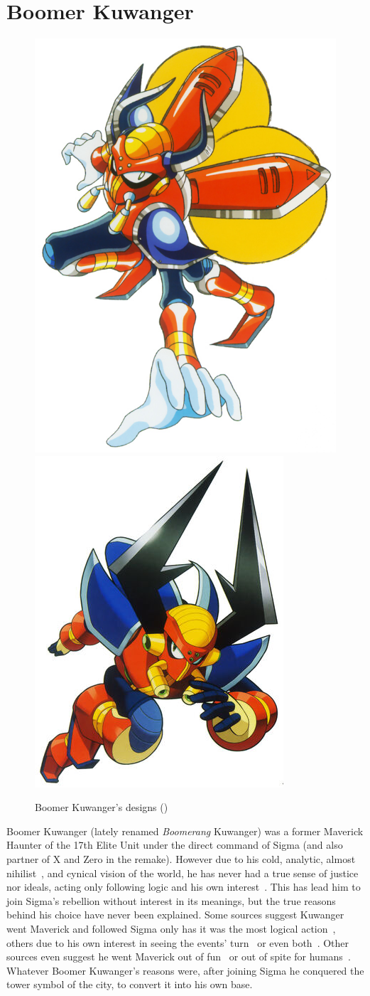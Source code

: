 \section{Boomer Kuwanger}\label{boss:Boomer_Kuwanger}
\begin{figure}[htp]
	\centering
	\includegraphics[width=0.4\linewidth]{figures/X1/Boomer_kuwanger/Boomer_kuwanger.jpg}
	\includegraphics[width=0.4\linewidth]{figures/X1/Boomer_kuwanger/MHXBoomerKuwanger.jpg}
	\caption{Boomer Kuwanger's designs (\cite{book:MMX_Complete_art})}
\end{figure}
Boomer Kuwanger (lately renamed \emph{Boomerang} Kuwanger) was a former Maverick Haunter of the 17th Elite Unit under the direct command of Sigma (and also partner of X and Zero in the \mhx remake). However due to his cold, analytic, almost nihilist~\cite{book:MH_field_guide}, and cynical vision of the world, he has never had a true sense of justice nor ideals, acting only following logic and his own interest~\cite{MHX:manual}. This has lead him to join Sigma's rebellion without interest in its meanings, but the true reasons behind his choice have never been explained. Some sources suggest Kuwanger went Maverick and followed Sigma only has it was the most logical action~\cite{MHX:manual}, others due to his own interest in seeing the events' turn~\cite{wiki:Boomer_kuwanger} or even both~\cite{book:MH_field_guide}. Other sources even suggest he went Maverick out of fun~\cite{Xcoll1:Manual_X1} or out of spite for humans~\cite{wayback:X_resources}. Whatever Boomer Kuwanger's reasons were, after joining Sigma he conquered the tower symbol of the city, to convert it into his own base.


